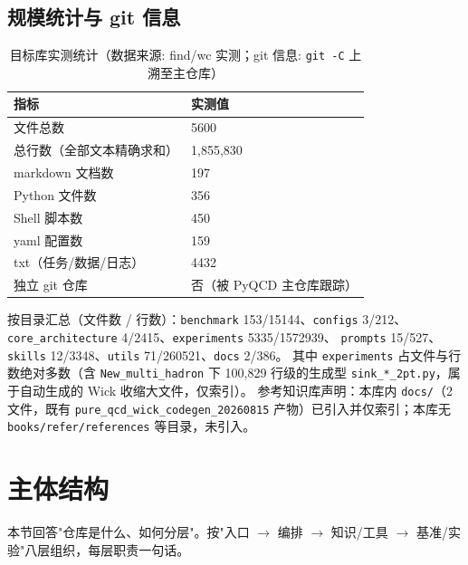 \documentclass[UTF8]{ctexart}
\begin{document}
\subsection{规模统计与 git 信息}

\begin{table}[htbp]\centering
\begin{tabular}{ll}
\toprule
指标 & 实测值 \\
\midrule
文件总数 & 5600 \\
总行数（全部文本精确求和） & 1,855,830 \\
markdown 文档数 & 197 \\
Python 文件数 & 356 \\
Shell 脚本数 & 450 \\
yaml 配置数 & 159 \\
txt（任务/数据/日志） & 4432 \\
独立 git 仓库 & 否（被 PyQCD 主仓库跟踪） \\
\bottomrule
\end{tabular}
\caption{目标库实测统计（数据来源: find/wc 实测；git 信息: \texttt{git -C} 上溯至主仓库）}
\end{table}

按目录汇总（文件数 / 行数）：\texttt{benchmark} 153/15144、\texttt{configs} 3/212、
\texttt{core\_architecture} 4/2415、\texttt{experiments} 5335/1572939、
\texttt{prompts} 15/527、\texttt{skills} 12/3348、\texttt{utils} 71/260521、\texttt{docs} 2/386。
其中 \texttt{experiments} 占文件与行数绝对多数（含 \texttt{New\_multi\_hadron} 下
100,829 行级的生成型 \texttt{sink\_*\_2pt.py}，属于自动生成的 Wick 收缩大文件，仅索引）。
参考知识库声明：本库内 \texttt{docs/}（2 文件，既有 \texttt{pure\_qcd\_wick\_codegen\_20260815}
产物）已引入并仅索引；本库无 \texttt{books/refer/references} 等目录，未引入。

\section{主体结构}

本节回答"仓库是什么、如何分层"。按"入口 $\rightarrow$ 编排 $\rightarrow$ 知识/工具 $\rightarrow$
基准/实验"八层组织，每层职责一句话。
\end{document}
